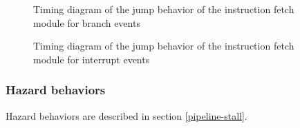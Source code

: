       \begin{figure}[H]
          \centering
          
          \caption{Timing diagram of the jump behavior of the instruction fetch module for branch events}
          \label{fig:ifm-behavior-branch}
        \end{figure}

      \begin{figure}[H]
          \centering
          
          \caption{Timing diagram of the jump behavior of the instruction fetch module for interrupt events}
          \label{fig:ifm-behavior-interrupt}
        \end{figure}

    \subsubsection{Hazard behaviors}

      \begin{content}
          Hazard behaviors are described in section \ref{pipeline-stall}.
        \end{content}

\newpage
